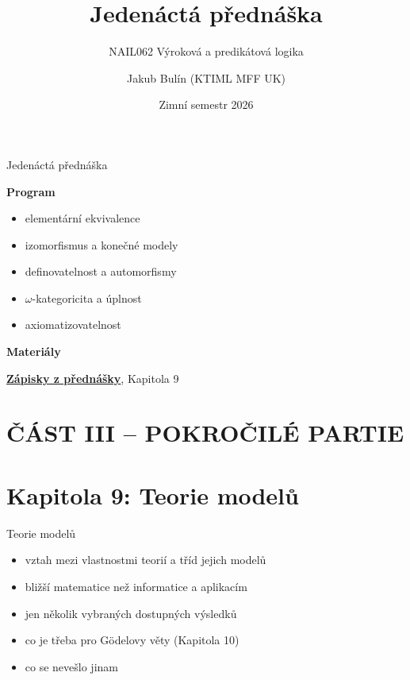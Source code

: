\documentclass{beamer}
\title{Jedenáctá přednáška}
\subtitle{NAIL062 Výroková a predikátová logika}
\author{Jakub Bulín (KTIML MFF UK)}
\date{Zimní semestr 2026}
\begin{document}
\maketitle


\begin{frame}{Jedenáctá přednáška}

    \textbf{Program}
        \begin{itemize}            
            \item elementární ekvivalence
            \item izomorfismus a konečné modely
            \item definovatelnost a automorfismy
            \item $\omega$-kategoricita a úplnost
            \item axiomatizovatelnost
        \end{itemize}

    \textbf{Materiály}

        \href{https://github.com/jbulin-mff-uk/nail062/raw/main/lecture/lecture-notes/lecture-notes.pdf}{\alert{\textbf{Zápisky z přednášky}}}, Kapitola 9

\end{frame}


\section{ČÁST III -- POKROČILÉ PARTIE}


\section{\sc Kapitola 9: Teorie modelů}


\begin{frame}{Teorie modelů}

    \begin{itemize}[<+->]
        \item vztah mezi vlastnostmi teorií a tříd jejich modelů
        \item bližší matematice než informatice a aplikacím
        \item jen několik vybraných dostupných výsledků
        \item[+] co je třeba pro Gödelovy věty (Kapitola 10)
        \item[+] co se nevešlo jinam 
    \end{itemize}

\end{frame}
\end{document}
